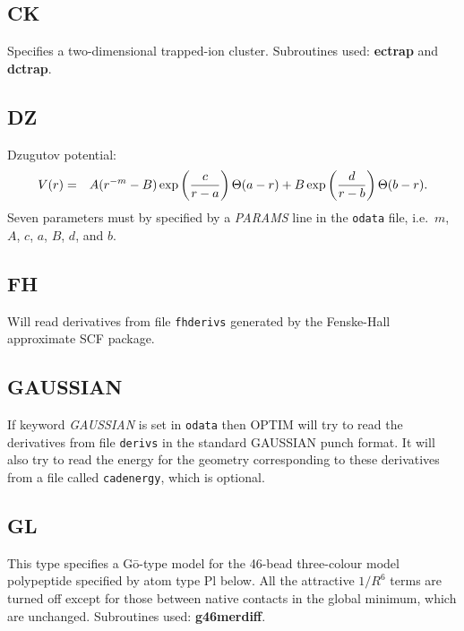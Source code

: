 \documentclass[12pt,a4paper,dvips]{article}
\begin{document}

\subsection{CK}Specifies a two-dimensional trapped-ion cluster. Subroutines used:
{\bf ectrap} and {\bf dctrap}.

\subsection{DZ}Dzugutov potential:\cite{Dzugutov92,Dzugutov93b}
\begin{eqnarray}
V(r)&=&A(r^{-m}-B) \exp\left( {c\over r-a}\right) \Theta(a-r) + 
    B \exp\left({d\over r-b}\right) \Theta(b-r). \nonumber
\end{eqnarray}
Seven parameters must by specified by a {\it PARAMS\/} line in the {\tt odata} file,
i.e.~$m$, $A$, $c$, $a$, $B$, $d$, and $b$.

\subsection{FH}Will read derivatives from file {\tt fhderivs} generated by the Fenske-Hall approximate
SCF package.\cite{hallf72}

\subsection{GAUSSIAN}If keyword {\it GAUSSIAN\/} is set in {\tt odata} then
OPTIM will try to read the derivatives from file {\tt derivs} in the
standard GAUSSIAN punch format.
It will also try to read the energy for the geometry
corresponding to these derivatives from a file called {\tt cadenergy}, which is optional.

\subsection{GL}This type specifies a G\={o}-type model\cite{uedatg78} for the
46-bead three-colour model polypeptide specified by atom type Pl below. 
All the attractive $1/R^6$ terms are turned off except for those between
native contacts in the global minimum, which are unchanged.
Subroutines used: {\bf g46merdiff}.
\end{document}
